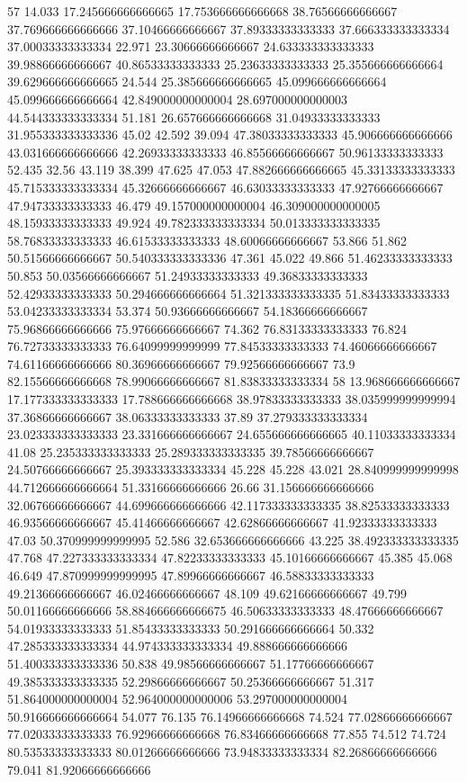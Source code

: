 57 14.033 17.245666666666665 17.753666666666668 38.76566666666667 37.769666666666666 37.10466666666667 37.89333333333333 37.666333333333334 37.00033333333334 22.971 23.30666666666667 24.633333333333333 39.98866666666667 40.86533333333333 25.23633333333333 25.355666666666664 39.629666666666665 24.544 25.385666666666665 45.099666666666664 45.099666666666664 42.849000000000004 28.697000000000003 44.544333333333334 51.181 26.657666666666668 31.04933333333333 31.955333333333336 45.02 42.592 39.094 47.38033333333333 45.906666666666666 43.031666666666666 42.26933333333333 46.85566666666667 50.96133333333333 52.435 32.56 43.119 38.399 47.625 47.053 47.882666666666665 45.33133333333333 45.715333333333334 45.32666666666667 46.63033333333333 47.92766666666667 47.94733333333333 46.479 49.157000000000004 46.309000000000005 48.15933333333333 49.924 49.782333333333334 50.013333333333335 58.76833333333333 46.61533333333333 48.60066666666667 53.866 51.862 50.51566666666667 50.540333333333336 47.361 45.022 49.866 51.46233333333333 50.853 50.03566666666667 51.24933333333333 49.36833333333333 52.42933333333333 50.294666666666664 51.321333333333335 51.83433333333333 53.04233333333334 53.374 50.93666666666667 54.18366666666667 75.96866666666666 75.97666666666667 74.362 76.83133333333333 76.824 76.72733333333333 76.64099999999999 77.84533333333333 74.46066666666667 74.61166666666666 80.36966666666667 79.92566666666667 73.9 82.15566666666668 78.99066666666667 81.83833333333334
58 13.968666666666667 17.177333333333333 17.788666666666668 38.97833333333333 38.035999999999994 37.36866666666667 38.06333333333333 37.89 37.279333333333334 23.023333333333333 23.331666666666667 24.655666666666665 40.11033333333334 41.08 25.235333333333333 25.289333333333335 39.78566666666667 24.50766666666667 25.393333333333334 45.228 45.228 43.021 28.840999999999998 44.712666666666664 51.33166666666666 26.66 31.156666666666666 32.06766666666667 44.699666666666666 42.117333333333335 38.82533333333333 46.93566666666667 45.41466666666667 42.62866666666667 41.92333333333333 47.03 50.370999999999995 52.586 32.653666666666666 43.225 38.492333333333335 47.768 47.227333333333334 47.82233333333333 45.10166666666667 45.385 45.068 46.649 47.870999999999995 47.89966666666667 46.58833333333333 49.21366666666667 46.02466666666667 48.109 49.62166666666667 49.799 50.01166666666666 58.884666666666675 46.50633333333333 48.47666666666667 54.01933333333333 51.85433333333333 50.291666666666664 50.332 47.285333333333334 44.974333333333334 49.888666666666666 51.400333333333336 50.838 49.98566666666667 51.17766666666667 49.385333333333335 52.29866666666667 50.25366666666667 51.317 51.864000000000004 52.964000000000006 53.297000000000004 50.916666666666664 54.077 76.135 76.14966666666668 74.524 77.02866666666667 77.02033333333333 76.92966666666668 76.83466666666668 77.855 74.512 74.724 80.53533333333333 80.01266666666666 73.94833333333334 82.26866666666666 79.041 81.92066666666666
